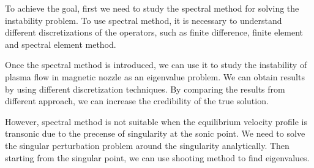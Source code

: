 To achieve the goal, first we need to study the spectral method for solving the instability problem. To use spectral method, it is necessary to understand different discretizations of the operators, such as finite difference, finite element and spectral element method.

Once the spectral method is introduced, we can use it to study the instability of plasma flow in magnetic nozzle as an eigenvalue problem. We can obtain results by using different discretization techniques. By comparing the results from different approach, we can increase the credibility of the true solution.

However, spectral method is not suitable when the equilibrium velocity profile is transonic due to the precense of singularity at the sonic point. We need to solve the singular perturbation problem around the singularity analytically. Then starting from the singular point, we can use shooting method to find eigenvalues.

